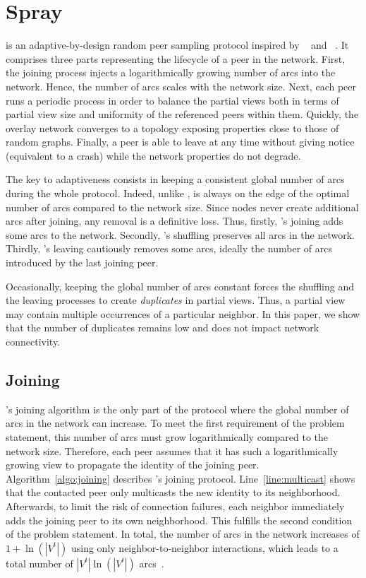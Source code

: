 
\section{Spray}
\label{sec:proposal}

\SPRAY is an adaptive-by-design random peer sampling protocol inspired by
\SCAMP~\cite{ganesh2001scamp,ganesh2003peer} and
\CYCLON~\cite{voulgaris2005cyclon}. It comprises three parts representing the
lifecycle of a peer in the network.  First, the joining process injects a
logarithmically growing number of arcs into the network. Hence, the number of
arcs scales with the network size.  Next, each peer runs a periodic process in
order to balance the partial views both in terms of partial view size and
uniformity of the referenced peers within them. Quickly, the overlay network
converges to a topology exposing properties close to those of random
graphs. Finally, a peer is able to leave at any time without giving notice
(equivalent to a crash) while the network properties do not degrade.

The key to adaptiveness consists in keeping a consistent global number
of arcs during the whole protocol. Indeed, unlike \CYCLON, \SPRAY is
always on the edge of the optimal number of arcs compared to the
network size. Since \SPRAY nodes never create additional arcs after
joining, any removal is a definitive loss. Thus, firstly, \SPRAY's
joining adds some arcs to the network. Secondly, \SPRAY's shuffling
preserves all arcs in the network. Thirdly, \SPRAY's leaving
cautiously removes some arcs, ideally the number of arcs introduced by
the last joining peer.

Occasionally, keeping the global number of arcs constant forces the shuffling
and the leaving processes to create \emph{duplicates} in partial views. Thus,
a partial view may contain multiple occurrences of a particular neighbor. In this
paper, we show that the number of duplicates remains low and does not
impact network connectivity.

\subsection{Joining}
\label{subsec:joining}

\SPRAY's joining algorithm is the only part of the protocol where the
global number of arcs in the network can increase. To meet the first
requirement of the problem statement, this number of arcs must grow
logarithmically compared to the network size. 
Therefore, each peer assumes that it has such a logarithmically
growing view to propagate the identity of the joining
peer. Algorithm~\ref{algo:joining} describes \SPRAY's joining
protocol. Line~\ref{line:multicast} shows that the contacted peer only
multicasts the new identity to its neighborhood. Afterwards, to limit
the risk of connection failures, each neighbor immediately adds the
joining peer to its own neighborhood. This fulfills the second
condition of the problem statement.  In total, the number of arcs in
the network increases of $1+\ln(|V^t|)$ using only
neighbor-to-neighbor interactions, which leads to a total number of
$|V^t|\ln(|V^t|)$ arcs~\cite{ganesh2001scamp}.

